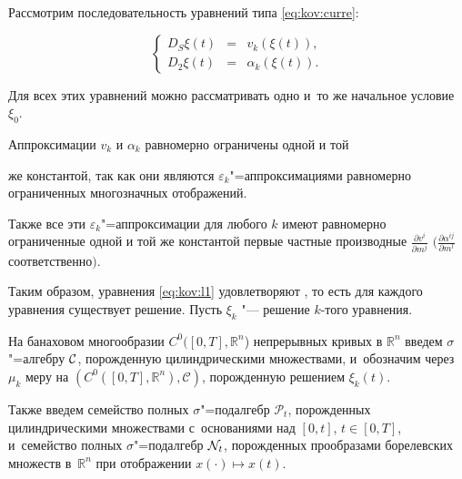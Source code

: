 Рассмотрим последовательность уравнений типа \eqref{eq:kov:curre}:

\begin{equation}\label{eq:kov:l1}

\left\{

\begin{array}{rcl}

D_S\xi(t) & = & v_k(\xi(t)),\\

D_2\xi(t) & = & \alpha_k(\xi(t)).

\end{array}

\right.

\end{equation}

Для всех этих уравнений можно рассматривать одно и~то же начальное условие $\xi_0$. 





Аппроксимации $v_k$ и $\alpha_k$ равномерно ограничены одной и той

же константой, так как они являются $\varepsilon_k$"=аппроксимациями равномерно ограниченных многозначных отображений.

Также все эти $\varepsilon_k$"=аппроксимации для любого $k$ имеют равномерно ограниченные одной и той же константой первые частные производные $\frac{\partial v^i}{\partial m^j}$ $\bigl({\frac

{\partial \alpha^{ij}}{\partial m^l}}$ соответственно$\bigr)$. 

Таким образом, уравнения  \eqref{eq:kov:l1} удовлетворяют \cite[теорема~3]{popovkoval:bib:AG1}, то есть для каждого уравнения существует решение. Пусть $\xi_k$ "--- решение $k$-того уравнения.



На банаховом многообразии $C^0([0,T],\mathbb{R}^n$) непрерывных кривых в $\mathbb{R}^n$ введем $\sigma$"=алгебру $\cal C$, порожденную цилиндрическими множествами, и~обозначим через $\mu_k$ меру на $(C^0([0,T],\mathbb{R}^n),\mathcal{C})$, порожденную решением $\xi_k(t)$. 

Также введем семейство полных $\sigma$"=подалгебр $\mathcal{P}_t$, порожденных цилиндрическими множествами с~основаниями над $[0, t]$, $t\in [0,T]$, и~семейство полных $\sigma$"=подалгебр ${\cal N}_t$, порожденных прообразами борелевских множеств в~$\mathbb{R}^n$ при отображении $x(\cdot) \mapsto x(t)$. 

